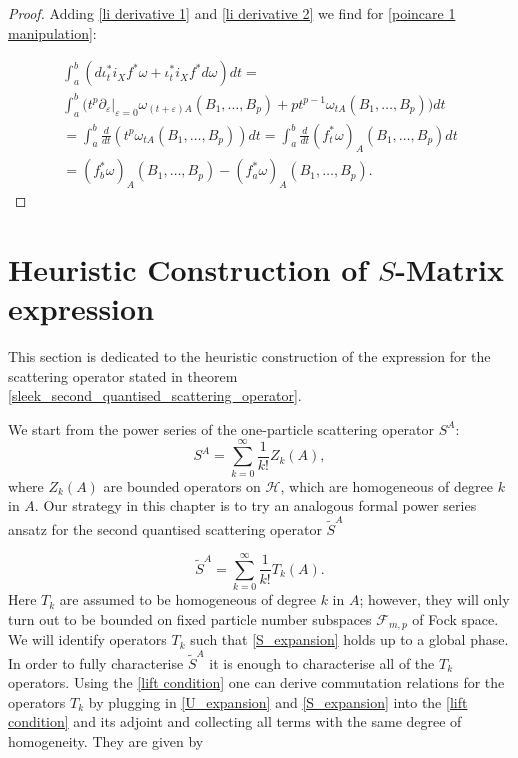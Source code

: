 \documentclass[b5paper,draft,openbib,12pt]{memoir}
\begin{document}
\begin{proof}
  Adding \eqref{li derivative 1} and \eqref{li derivative 2} we find for \eqref{poincare 1 manipulation}:
  
  \begin{align}
  \int_a^b (d\iota_t^* i_X f^* \omega+ \iota_t^* i_X f^* d \omega )dt=\\
  \int_a^b  \Big( t^p\partial_{\varepsilon}|_{\varepsilon=0} \omega_{(t+\varepsilon)A}(B_1,\dots, B_p)
  +p t^{p-1}\omega_{tA}(B_1,\dots, B_p)\Big) dt\\
  =\int_a^b  \frac{d}{dt} (t^p \omega_{tA}(B_1,\dots, B_p))dt =\int_a^b  \frac{d}{dt} (f^*_t \omega)_{A}(B_1,\dots, B_p)dt\\
  =(f^*_b\omega)_A(B_1,\dots,B_p)-(f^*_a\omega)_A(B_1,\dots,B_p).
  \end{align}
  
  \end{proof}



\section{Heuristic Construction of \(S\)-Matrix expression}\label{sec:heuristic construction}

This section is dedicated to the heuristic construction of 
the expression for the scattering operator stated in theorem 
\ref{sleek_second_quantised_scattering_operator}.

We start from the power series of the one-particle 
scattering operator \(S^A\):
\begin{equation}\label{U_expansion}
S^A = \sum_{k=0}^\infty \frac{1}{k!} Z_k(A),
\end{equation}
where \(Z_k(A)\) are bounded operators on \(\mathcal{H}\), 
which are homogeneous of degree \(k\) in \(A\).
Our strategy in this chapter is to try an analogous formal 
power series ansatz for the second quantised scattering 
operator \(\tilde{S}^A\)

\begin{equation}\label{S_expansion}
\tilde{S}^A=\sum_{k=0}^\infty \frac{1}{k!} T_k(A).
\end{equation}
Here \(T_k\) are assumed to be homogeneous of degree 
\(k\) in \(A\); however, they will only turn out to be 
bounded on
fixed particle number subspaces \(\mathcal{F}_{m,p}\) of 
Fock space. We will identify operators \(T_k\) such that 
\eqref{S_expansion}
holds up to a global phase. 
In order to fully characterise \(\tilde{S}^A\) it is enough 
to characterise all of the \(T_k\) operators. 
Using the \eqref{lift condition} one can derive commutation 
relations for the operators 
\(T_k\) by plugging in \eqref{U_expansion} and 
\eqref{S_expansion} into the \eqref{lift condition} 
and its adjoint
and collecting all terms with the same degree of homogeneity. 
They are given by
\end{document}
